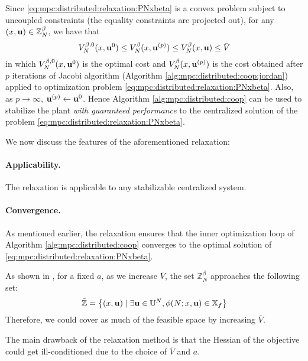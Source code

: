 Since \eqref{eq:mpc:distributed:relaxation:PNxbeta} is a convex
problem subject to uncoupled constraints (the equality constraints are
projected out), for any $(x,\mathbf{u}) \in \mathbb{Z}_N^\beta$, we have that
\[V_N^{\beta,0}(x,\mathbf{u}^0) \leq V_N^\beta(x,\mathbf{u}^{(p)}) \leq
V_N^\beta(x,\mathbf{u}) \leq \bar{V} \]
in which $V_N^{\beta,0}(x,\mathbf{u}^0)$ is the optimal cost and
$V_N^\beta(x,\mathbf{u}^{(p)})$ is the cost obtained after $p$ iterations of
Jacobi algorithm (Algorithm \ref{alg:mpc:distributed:coop:jordan}) applied
to optimization problem
\eqref{eq:mpc:distributed:relaxation:PNxbeta}. Also, as $p \rightarrow
\infty$, $\mathbf{u}^{(p)} \leftarrow \mathbf{u}^0$. Hence Algorithm
\ref{alg:mpc:distributed:coop} can be used to stabilize the plant
{\emph{with guaranteed performance}} to the centralized solution of
the problem \eqref{eq:mpc:distributed:relaxation:PNxbeta}.


We now discuss the features of the aforementioned relaxation:

\paragraph{Applicability.} The relaxation is applicable to any
stabilizable centralized system. 

\paragraph{Convergence.} As mentioned earlier, the relaxation ensures
that the inner optimization loop of Algorithm \ref{alg:mpc:distributed:coop} converges
to the optimal solution of \eqref{eq:mpc:distributed:relaxation:PNxbeta}. 

As shown in
\citet{pannocchia:rawlings:wright:2011}, for a fixed $a$, as we
increase $\bar{V}$, the set $\mathbb{Z}_N^\beta$ approaches the following set:
\[\bar{\mathbb{Z}} =  \left\lbrace (x,\mathbf{u}) \mid \exists \mathbf{u} \in \mathbb{U}^N,
  \phi(N;x,\mathbf{u}) \in \mathbb{X}_f \right\rbrace
\]
Therefore, we could cover as much of the  feasible space by increasing $\bar{V}$.

The main drawback of the relaxation method is that the Hessian of the objective could get
ill-conditioned due to the choice of $\bar{V}$ and $a$.

